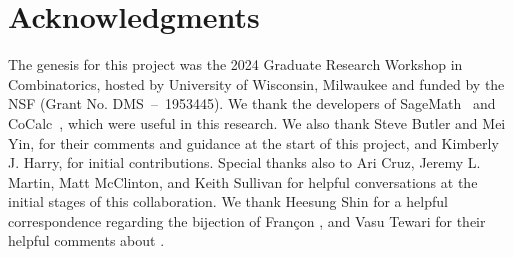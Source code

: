 \documentclass{amsart}
\theoremstyle{definition}
\begin{document}
\section*{Acknowledgments}
The genesis for this project was the 2024 Graduate Research Workshop in Combinatorics, hosted by University of Wisconsin, Milwaukee and funded by the NSF (Grant No. DMS~--~1953445).
We thank the developers of
SageMath~\cite{sage} and CoCalc~\cite{SMC}, which were useful in this research.
We also thank Steve Butler and Mei Yin, for their comments and guidance at the start of this project, and Kimberly J. Harry, for initial contributions. Special thanks also to Ari Cruz, Jeremy L. Martin, Matt McClinton, and Keith Sullivan for helpful conversations at the initial stages of this collaboration. We thank Heesung Shin for a helpful correspondence regarding the bijection of Fran\c{c}on \cite{francon_acyclic_1975}, and Vasu Tewari for their helpful comments about . 



\end{document}
